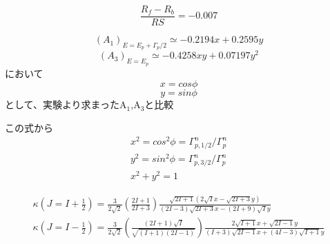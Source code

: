 \documentclass[11pt,a4paper]{jsarticle}
\begin{document}
$$
\frac{R_f-R_b}{RS}=-0.007
$$

\newpage
$$
(A_1)_{E=E_p+\Gamma_p/2} \simeq -0.2194x+0.2595y  
$$
$$
(A_3)_{E=E_p} \simeq -0.4258xy+0.07197y^2
$$
\hspace{4cm}において
$$
x=cos\phi
$$
$$
y=sin\phi
$$
\hspace{4cm}として、実験より求まったA$_1$,A$_3$と比較


この式から
\begin{eqnarray}
x^2 = cos^2\phi = \Gamma^n_{p,1/2}/\Gamma^n_p  \nonumber \\
y^2 = sin^2\phi = \Gamma^n_{p,3/2}/\Gamma^n_p \nonumber  \\
x^2+y^2=1 \nonumber
\end{eqnarray}



\begin{eqnarray}
\kappa (J=I+\frac{1}{2})=\frac{3}{2\sqrt{2}}\left( \frac{2I+1}{2I+3} \right)
\frac{\sqrt{2I+1}(2\sqrt{I}x-\sqrt{2I+3}y)}{(2I-3)\sqrt{2I+3}x-(2I+9)\sqrt{I}y}
\nonumber\\
\kappa (J=I-\frac{1}{2})=\frac{3}{2\sqrt{2}}\left( \frac{(2I+1)\sqrt{I}}{\sqrt{(I+1)(2I-1)}} \right)
\frac{2\sqrt{I+1}x+\sqrt{2I-1}y}{(I+3)\sqrt{2I-1}x+(4I-3)\sqrt{I+1}y}
\nonumber\\
\end{eqnarray}





%
%
\end{document}
